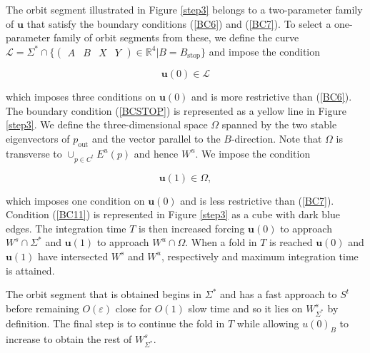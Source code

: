\documentclass{ws-ijbc}
\begin{document}
The orbit segment illustrated in Figure \ref{step3} belongs to a two-parameter family of $\mathbf{u}$ that satisfy the boundary conditions (\ref{BC6}) and (\ref{BC7}).  To select a one-parameter family of orbit segments from these, we define the curve $\mathscr{L} = \Sigma^*\cap \{ \begin{pmatrix} A & B & X & Y \end{pmatrix} \in \mathbb{R}^4 | B = B_{\text{stop}}\}$ and impose the condition
    
    
\begin{equation}
\mathbf{u}(0) \in \mathscr{L}
\label{BCSTOP}
\end{equation}
    
\noindent
which imposes three conditions on $\mathbf{u}(0)$ and is more restrictive than (\ref{BC6}).  The boundary condition (\ref{BCSTOP}) is represented as a yellow line in Figure \ref{step3}.  We define the three-dimensional space $\Omega$ spanned by the two stable eigenvectors of $p_{\text{out}}$ and the vector parallel to the $B$-direction.  Note that $\Omega$ is transverse to $\cup_{p \in C^t}E^u(p)$ and hence $W^u$.  We impose the condition
    
\begin{equation}
\mathbf{u}(1) \in \Omega,
\label{BC11}
\end{equation}
    
\noindent
which imposes one condition on $\mathbf{u}(0)$ and is less restrictive than (\ref{BC7}).  Condition (\ref{BC11}) is represented in Figure \ref{step3} as a cube with dark blue edges.  The integration time $T$ is then increased forcing $\mathbf{u}(0)$ to approach $W^s \cap \Sigma^*$ and $\mathbf{u}(1)$ to approach $W^u \cap \Omega$. When a fold in $T$ is reached $\mathbf{u}(0)$ and $\mathbf{u}(1)$ have intersected $W^s$ and $W^u$, respectively and maximum integration time is attained.  
    
The orbit segment that is obtained begins in $\Sigma^*$ and has a fast approach to $S^t$ before remaining $O(\varepsilon)$ close for $O(1)$ slow time and so it lies on $W^{s}_{\Sigma^*}$ by definition.  The final step is to continue the fold in $T$ while allowing $u(0)_B$ to increase to obtain the rest of $W^{s}_{\Sigma^*}$.  
\end{document}
